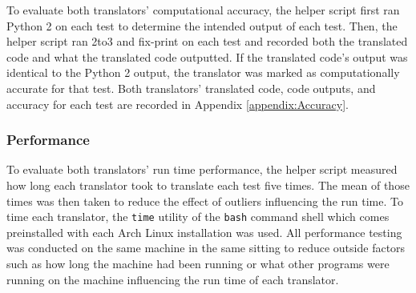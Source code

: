To evaluate both translators' computational accuracy, the helper script first ran Python 2 on each test to determine the intended output of each test. Then, the helper script ran 2to3 and fix-print on each test and recorded both the translated code and what the translated code outputted. If the translated code's output was identical to the Python 2 output, the translator was marked as computationally accurate for that test. Both translators' translated code, code outputs, and accuracy for each test are recorded in Appendix \ref{appendix:Accuracy}.

\subsubsection{Performance}
To evaluate both translators' run time performance, the helper script measured how long each translator took to translate each test five times. The mean of those times was then taken to reduce the effect of outliers influencing the run time. To time each translator, the \verb|time| utility of the \verb|bash| command shell which comes preinstalled with each Arch Linux installation was used. All performance testing was conducted on the same machine in the same sitting to reduce outside factors such as how long the machine had been running or what other programs were running on the machine influencing the run time of each translator.